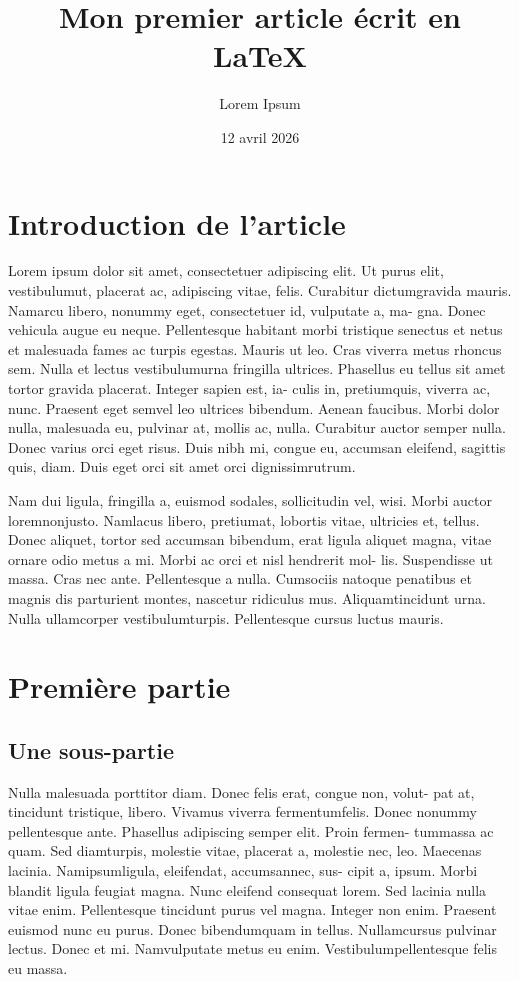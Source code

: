\documentclass[12pt,twocolumn,twoside]{article}
\title{Mon premier article écrit en \LaTeX}
\author{Lorem Ipsum}
\date{12 avril 2026}
\begin{document}
\maketitle
\section*{Introduction de l'article}

Lorem ipsum dolor sit amet, consectetuer adipiscing elit. Ut purus elit,
vestibulumut, placerat ac, adipiscing vitae, felis. Curabitur dictumgravida
mauris. Namarcu libero, nonummy eget, consectetuer id, vulputate a, ma- gna. Donec vehicula augue eu neque. Pellentesque habitant morbi tristique
senectus et netus et malesuada fames ac turpis egestas. Mauris ut leo. Cras
viverra metus rhoncus sem. Nulla et lectus vestibulumurna fringilla ultrices.
Phasellus eu tellus sit amet tortor gravida placerat. Integer sapien est, ia-
culis in, pretiumquis, viverra ac, nunc. Praesent eget semvel leo ultrices
bibendum. Aenean faucibus. Morbi dolor nulla, malesuada eu, pulvinar at,
mollis ac, nulla. Curabitur auctor semper nulla. Donec varius orci eget risus.
Duis nibh mi, congue eu, accumsan eleifend, sagittis quis, diam. Duis eget
orci sit amet orci dignissimrutrum.

Nam dui ligula, fringilla a, euismod sodales, sollicitudin vel, wisi. Morbi
auctor loremnonjusto. Namlacus libero, pretiumat, lobortis vitae, ultricies
et, tellus. Donec aliquet, tortor sed accumsan bibendum, erat ligula aliquet
magna, vitae ornare odio metus a mi. Morbi ac orci et nisl hendrerit mol-
lis. Suspendisse ut massa. Cras nec ante. Pellentesque a nulla. Cumsociis
natoque penatibus et magnis dis parturient montes, nascetur ridiculus mus.
Aliquamtincidunt urna. Nulla ullamcorper vestibulumturpis. Pellentesque
cursus luctus mauris.

\section{Première partie}
\subsection{Une sous-partie}
Nulla malesuada porttitor diam. Donec felis erat, congue non, volut-
pat at, tincidunt tristique, libero. Vivamus viverra fermentumfelis. Donec
nonummy pellentesque ante. Phasellus adipiscing semper elit. Proin fermen-
tummassa ac quam. Sed diamturpis, molestie vitae, placerat a, molestie
nec, leo. Maecenas lacinia. Namipsumligula, eleifendat, accumsannec, sus-
cipit a, ipsum. Morbi blandit ligula feugiat magna. Nunc eleifend consequat
lorem. Sed lacinia nulla vitae enim. Pellentesque tincidunt purus vel magna.
Integer non enim. Praesent euismod nunc eu purus. Donec bibendumquam
in tellus. Nullamcursus pulvinar lectus. Donec et mi. Namvulputate metus
eu enim. Vestibulumpellentesque felis eu massa.
\end{document}

